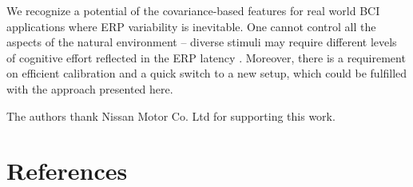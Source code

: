 \documentclass[12pt]{iopart}
\begin{document}

We recognize a potential of the covariance-based features
for real world BCI applications where ERP variability is inevitable. 
One cannot control all the aspects of the natural environment --
diverse stimuli may require different levels of cognitive
effort reflected in the ERP latency \cite{kutas_augmenting_1977}.
Moreover, there is a requirement on efficient calibration and 
a quick switch to a new setup, which could be fulfilled with the approach presented here. 

\ack

The authors thank Nissan Motor Co. Ltd for supporting
this work.

\section*{References}



\end{document}
